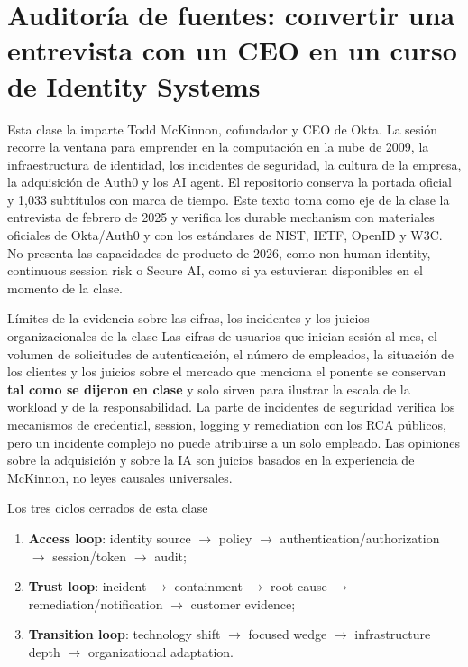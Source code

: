 \section{Auditoría de fuentes: convertir una entrevista con un CEO en un curso de Identity Systems}

Esta clase la imparte Todd McKinnon, cofundador y CEO de Okta. La sesión recorre la ventana para emprender en la computación en la nube de 2009, la infraestructura de identidad, los incidentes de seguridad, la cultura de la empresa, la adquisición de Auth0 y los AI agent. El repositorio conserva la portada oficial y 1,033 subtítulos con marca de tiempo. Este texto toma como eje de la clase la entrevista de febrero de 2025 y verifica los durable mechanism con materiales oficiales de Okta/Auth0 y con los estándares de NIST, IETF, OpenID y W3C. No presenta las capacidades de producto de 2026, como non-human identity, continuous session risk o Secure AI, como si ya estuvieran disponibles en el momento de la clase.

\begin{warningbox}{Límites de la evidencia sobre las cifras, los incidentes y los juicios organizacionales de la clase}
Las cifras de usuarios que inician sesión al mes, el volumen de solicitudes de autenticación, el número de empleados, la situación de los clientes y los juicios sobre el mercado que menciona el ponente se conservan \textbf{tal como se dijeron en clase} y solo sirven para ilustrar la escala de la workload y de la responsabilidad. La parte de incidentes de seguridad verifica los mecanismos de credential, session, logging y remediation con los RCA públicos, pero un incidente complejo no puede atribuirse a un solo empleado. Las opiniones sobre la adquisición y sobre la IA son juicios basados en la experiencia de McKinnon, no leyes causales universales.
\end{warningbox}

\begin{importantbox}{Los tres ciclos cerrados de esta clase}
\begin{enumerate}
  \item \textbf{Access loop}: identity source $\rightarrow$ policy $\rightarrow$ authentication/authorization $\rightarrow$ session/token $\rightarrow$ audit;
  \item \textbf{Trust loop}: incident $\rightarrow$ containment $\rightarrow$ root cause $\rightarrow$ remediation/notification $\rightarrow$ customer evidence;
  \item \textbf{Transition loop}: technology shift $\rightarrow$ focused wedge $\rightarrow$ infrastructure depth $\rightarrow$ organizational adaptation.
\end{enumerate}
\end{importantbox}

